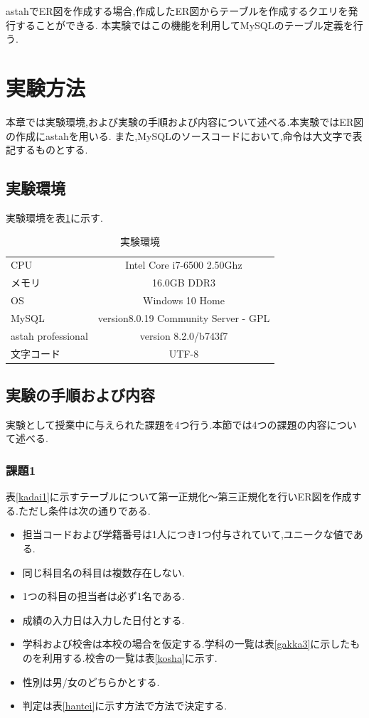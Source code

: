 \documentclass[a4j]{jarticle}
\begin{document}
        astahでER図を作成する場合,作成したER図からテーブルを作成するクエリを発行することができる.
        本実験ではこの機能を利用してMySQLのテーブル定義を行う.

    \section{実験方法}
    本章では実験環境,および実験の手順および内容について述べる.本実験ではER図の作成にastahを用いる.
    また,MySQLのソースコードにおいて,命令は大文字で表記するものとする.
    \subsection{実験環境}
    \begin{table}[H]
      \caption{実験環境}
      実験環境を表\ref{kankyou}に示す.
      \label{kankyou}
      \begin{center}
          \begin{tabular}{l|c}\hline
            CPU & Intel Core i7-6500 2.50Ghz \\ 
            メモリ & 16.0GB DDR3 \\
            OS & Windows 10 Home \\
            MySQL & version8.0.19 Community Server - GPL \\ 
            astah professional  & version 8.2.0/b743f7 \\
            文字コード & UTF-8 \\ \hline
          \end{tabular}
      \end{center}
      \end{table}

    \subsection{実験の手順および内容}
    実験として授業中に与えられた課題を4つ行う.本節では4つの課題の内容について述べる.
    \subsubsection{課題1}
      表\ref{kadai1}に示すテーブルについて第一正規化～第三正規化を行いER図を作成する.ただし条件は次の通りである.
      \begin{itemize}
        \item 担当コードおよび学籍番号は1人につき1つ付与されていて,ユニークな値である.
        \item 同じ科目名の科目は複数存在しない.
        \item 1つの科目の担当者は必ず1名である.
        \item 成績の入力日は入力した日付とする.
        \item 学科および校舎は本校の場合を仮定する\cite{NNCT}.学科の一覧は表\ref{gakka3}に示したものを利用する.校舎の一覧は表\ref{kosha}に示す.
        \item 性別は男/女のどちらかとする.
        \item 判定は表\ref{hantei}に示す方法で方法で決定する.
      \end{itemize}
      
\end{document}
